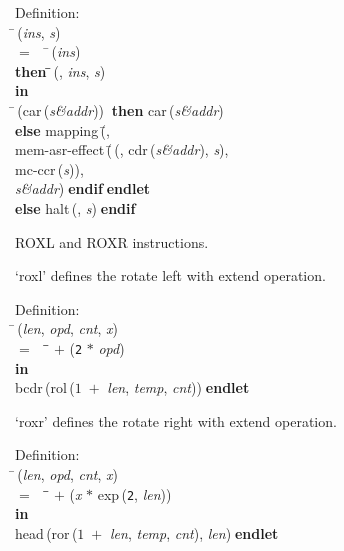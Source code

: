 \begin{tabbing}{\sc Definition}: \\  
\=\,({\it{ins\/}}, {\it{s\/}}) \\ 
$=$$\;\;\;\;$\=\,({\it{ins\/}}) \\ 
{\bf then }\=\=\,({}, {\it{ins\/}}, {\it{s\/}})\- \\ 
{\bf in} \\ 
\=\,({\rm{car}}\,({\it{s\&addr\/}}))$\;\;${\bf then }{\rm{car}}\,({\it{s\&addr\/}}) \\ 
{\bf else }{\rm{mapping}}\,(\=, \\ 
{\rm{mem-asr-effect}}\,(\=\,({}, {\rm{cdr}}\,({\it{s\&addr\/}}), {\it{s\/}}), \\ 
{\rm{mc-ccr}}\,({\it{s\/}}))\-, \\ 
{\it{s\&addr\/}})\-$\;${\bf  endif}\-$\;${\bf  endlet}\- \\ 
{\bf else }{\rm{halt}}\,({}, {\it{s\/}})$\;${\bf  endif}\-\-
\end{tabbing}

 ROXL and ROXR instructions.

 `roxl' defines the rotate left with extend operation.
\begin{tabbing}{\sc Definition}: \\  
\=\,({\it{len\/}}, {\it{opd\/}}, {\it{cnt\/}}, {\it{x\/}}) \\ 
$=$$\;\;\;\;$\=\= $+$ ({\tt{2}} $*$ {\it{opd\/}})\- \\ 
{\bf in} \\ 
{\rm{bcdr}}\,({\rm{rol}}\,($1\;+$ {\it{len\/}}, {\it{temp\/}}, {\it{cnt\/}}))$\;${\bf  endlet}\-\-
\end{tabbing}

 `roxr' defines the rotate right with extend operation.
\begin{tabbing}{\sc Definition}: \\  
\=\,({\it{len\/}}, {\it{opd\/}}, {\it{cnt\/}}, {\it{x\/}}) \\ 
$=$$\;\;\;\;$\=\= $+$ ({\it{x\/}} $*$ {\rm{exp}}\,({\tt{2}}, {\it{len\/}}))\- \\ 
{\bf in} \\ 
{\rm{head}}\,({\rm{ror}}\,($1\;+$ {\it{len\/}}, {\it{temp\/}}, {\it{cnt\/}}), {\it{len\/}})$\;${\bf  endlet}\-\-
\end{tabbing}

